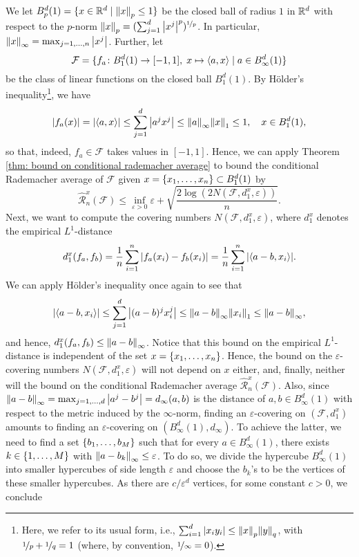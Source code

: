 \begin{example}
We let $B_p^d(1) = \{x \in \mathbb{R}^d \mathrel{|} \norm{x}_p \leq 1\}$ be the closed ball of radius $1$ in $\mathbb{R}^d$ with respect to the $p$-norm $\norm{x}_p = (\sum_{j=1}^d \abs{x^j}^p)^{\nicefrac{1}{p}}$. In particular, $\norm{x}_{\infty} = \max_{j=1, \dots, n} \abs{x^j}$. Further, let
\[
    \mathcal{F} = \{f_a \colon B_1^d(1) \to [-1, 1], \; x \mapsto \langle a, x \rangle \mathrel{|} a \in B_{\infty}^d(1)\}
\]
be the class of linear functions on the closed ball $B_1^d(1)$. By H{\"o}lder's inequality\footnote{Here, we refer to its usual form, i.e., $\sum_{i=1}^d \abs{x_i y_i} \leq \norm{x}_p \norm{y}_q$, with $\nicefrac{1}{p} + \nicefrac{1}{q} = 1$ (where, by convention, $\nicefrac{1}{\infty} = 0$).}, we have
\[
    \abs{f_a(x)} = \abs{\langle a, x \rangle} \leq \sum_{j=1}^d \abs{a^j x^j} \leq \norm{a}_{\infty} \norm{x}_1 \leq 1, \quad x \in B_1^d(1),
\]
so that, indeed, $f_a \in \mathcal{F}$ takes values in $[-1, 1]$. Hence, we can apply Theorem \ref{thm: bound on conditional rademacher average} to bound the conditional Rademacher average of $\mathcal{F}$ given $x = \left\{x_1, \dots, x_n\right\} \subset B_1^d(1)$ by
\[
    \hat{\mathcal{R}}_n^x(\mathcal{F}) \leq \inf_{\varepsilon > 0} \varepsilon + \sqrt{\frac{2 \log(2 N(\mathcal{F}, d_1^x, \varepsilon))}{n}}.
\]
Next, we want to compute the covering numbers $N(\mathcal{F}, d_1^x, \varepsilon)$, where $d_1^x$ denotes the empirical $L^1$-distance
\[
    d_1^x(f_a, f_b) = \frac{1}{n} \sum_{i=1}^n \abs{f_a(x_i) - f_b(x_i)} = \frac{1}{n} \sum_{i=1}^n \abs{ \langle a - b, x_i \rangle }.
\]
We can apply H{\"o}lder's inequality once again to see that
\[
    \abs{ \langle a - b, x_i \rangle } \leq \sum_{j=1}^d \big\lvert(a-b)^j x_i^j\big\rvert \leq \norm{a-b}_{\infty} \norm{x_i}_1 \leq \norm{a-b}_{\infty},
\]
and hence, $d_1^x(f_a, f_b) \leq \norm{a - b}_{\infty}$. Notice that this bound on the empirical $L^1$-distance is independent of the set $x = \left\{x_1, \dots, x_n\right\}$. Hence, the bound on the $\varepsilon$-covering numbers $N(\mathcal{F}, d_1^x, \varepsilon)$ will not depend on $x$ either, and, finally, neither will the bound on the conditional Rademacher average $\hat{\mathcal{R}}_n^x(\mathcal{F})$. Also, since $\norm{a - b}_{\infty} = \max_{j = 1, \dots, d} \abs{a^j - b^j} = d_{\infty}(a, b)$ is the distance of $a, b \in B_{\infty}^d(1)$ with respect to the metric induced by the $\infty$-norm, finding an $\varepsilon$-covering on $(\mathcal{F}, d_1^x)$ amounts to finding an $\varepsilon$-covering on $(B_{\infty}^d(1), d_{\infty})$. To achieve the latter, we need to find a set $\left\{b_1, \dots, b_M\right\}$ such that for every $a \in B_{\infty}^d(1)$, there exists $k \in \left\{1, \dots, M\right\}$ with $\norm{a - b_k}_{\infty} \leq \varepsilon$. {\color{red} To do so, we divide the hypercube $B_{\infty}^d(1)$ into smaller hypercubes of side length $\varepsilon$ and choose the $b_k$'s to be the vertices of these smaller hypercubes.} As there are $c / \varepsilon^d$ vertices, for some constant $c > 0$, we conclude

\end{example}
